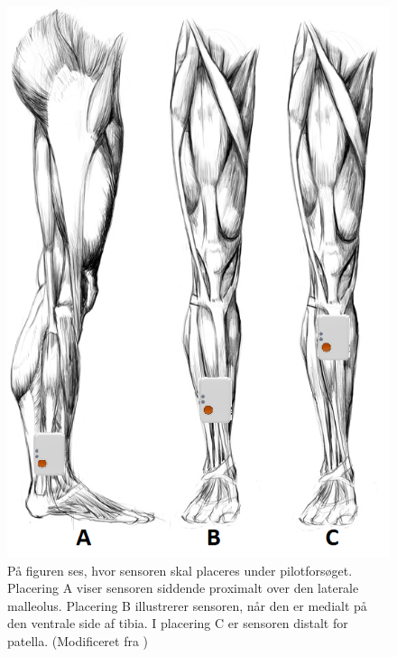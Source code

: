 \begin{figure}[H]
	\centering
	\includegraphics[scale=0.6]{figures/qBilag/Sensor_placering.png}
	\caption{På figuren ses, hvor sensoren skal placeres under pilotforsøget. Placering A viser sensoren siddende proximalt over den laterale malleolus. Placering B illustrerer sensoren, når den er medialt på den ventrale side af tibia. I placering C er sensoren distalt for patella. (Modificeret fra \cite{Perna2016,Shimmer2016})}
	\label{fig:sensor_placering}
\end{figure}

